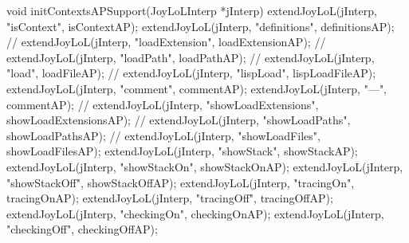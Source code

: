 \startCCode
void initContextsAPSupport(JoyLoLInterp *jInterp) {
  extendJoyLoL(jInterp, "isContext",           isContextAP);
  extendJoyLoL(jInterp, "definitions",         definitionsAP);
//  extendJoyLoL(jInterp, "loadExtension",       loadExtensionAP);
//  extendJoyLoL(jInterp, "loadPath",            loadPathAP);
//  extendJoyLoL(jInterp, "load",                loadFileAP);
//  extendJoyLoL(jInterp, "lispLoad",            lispLoadFileAP);
  extendJoyLoL(jInterp, "comment",             commentAP);
  extendJoyLoL(jInterp, "---",                 commentAP);
//  extendJoyLoL(jInterp, "showLoadExtensions",  showLoadExtensionsAP);
//  extendJoyLoL(jInterp, "showLoadPaths",       showLoadPathsAP);
//  extendJoyLoL(jInterp, "showLoadFiles",       showLoadFilesAP);
  extendJoyLoL(jInterp, "showStack",           showStackAP);
  extendJoyLoL(jInterp, "showStackOn",         showStackOnAP);
  extendJoyLoL(jInterp, "showStackOff",        showStackOffAP);
  extendJoyLoL(jInterp, "tracingOn",           tracingOnAP);
  extendJoyLoL(jInterp, "tracingOff",          tracingOffAP);
  extendJoyLoL(jInterp, "checkingOn",          checkingOnAP);
  extendJoyLoL(jInterp, "checkingOff",         checkingOffAP);
}
\stopCCode